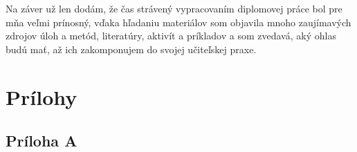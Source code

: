 Na záver už len dodám, že čas strávený vypracovaním diplomovej práce bol pre mňa veľmi prínosný, vďaka hľadaniu materiálov som objavila mnoho zaujímavých zdrojov úloh a metód, literatúry, aktivít a príkladov a som zvedavá, aký ohlas budú mať, až ich zakomponujem do svojej učiteľskej praxe.


\renewcommand{\bibname}{Zoznam použitej literatúry}
\HlavickaLiteratura
\label{chap:bib}
                           \nocite{*}
\printbibliography


\chapter*{Prílohy}
\label{chap:pril}

\section*{Príloha A}
